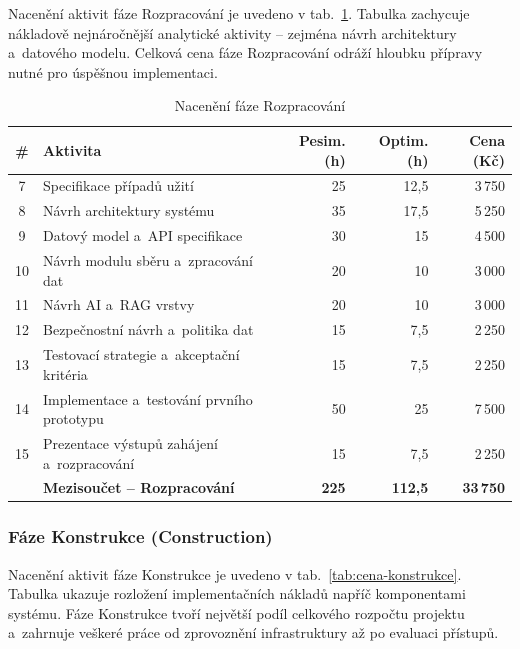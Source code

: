 \documentclass[a4paper, 11pt]{article}
\begin{document}
Nacenění aktivit fáze Rozpracování je uvedeno v tab.~\ref{tab:cena-rozpracovani}.
Tabulka zachycuje nákladově nejnáročnější analytické aktivity -- zejména návrh architektury a~datového modelu. Celková cena fáze Rozpracování odráží hloubku přípravy nutné pro úspěšnou implementaci.

\begin{table}[H]
\centering\small
\begin{tabularx}{\textwidth}{c X r r r}
\toprule
\textbf{\#} & \textbf{Aktivita} & \textbf{Pesim. (h)} & \textbf{Optim. (h)} & \textbf{Cena (Kč)} \\
\midrule
7 & Specifikace případů užití & 25 & 12,5 & 3\,750 \\
8 & Návrh architektury systému & 35 & 17,5 & 5\,250 \\
9 & Datový model a~API specifikace & 30 & 15 & 4\,500 \\
10 & Návrh modulu sběru a~zpracování dat & 20 & 10 & 3\,000 \\
11 & Návrh AI a~RAG vrstvy & 20 & 10 & 3\,000 \\
12 & Bezpečnostní návrh a~politika dat & 15 & 7,5 & 2\,250 \\
13 & Testovací strategie a~akceptační kritéria & 15 & 7,5 & 2\,250 \\
14 & Implementace a~testování prvního prototypu & 50 & 25 & 7\,500 \\
15 & Prezentace výstupů zahájení a~rozpracování & 15 & 7,5 & 2\,250 \\
\midrule
& \textbf{Mezisoučet -- Rozpracování} & \textbf{225} & \textbf{112,5} & \textbf{33\,750} \\
\bottomrule
\end{tabularx}
\caption{Nacenění fáze Rozpracování}
\label{tab:cena-rozpracovani}
\end{table}

\subsubsection{Fáze Konstrukce (Construction)}

Nacenění aktivit fáze Konstrukce je uvedeno v tab.~\ref{tab:cena-konstrukce}.
Tabulka ukazuje rozložení implementačních nákladů napříč komponentami systému. Fáze Konstrukce tvoří největší podíl celkového rozpočtu projektu a~zahrnuje veškeré práce od zprovoznění infrastruktury až po evaluaci přístupů.
\end{document}
